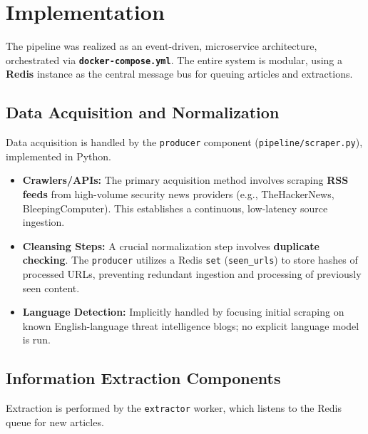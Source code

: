 \section{Implementation}

The pipeline was realized as an event-driven, microservice architecture, orchestrated via \textbf{\texttt{docker-compose.yml}}. The entire system is modular, using a \textbf{Redis} instance as the central message bus for queuing articles and extractions.

\subsection{Data Acquisition and Normalization}
Data acquisition is handled by the \texttt{producer} component (\texttt{pipeline/scraper.py}), implemented in Python.

\begin{itemize}
    \item \textbf{Crawlers/APIs:} The primary acquisition method involves scraping \textbf{RSS feeds} from high-volume security news providers (e.g., TheHackerNews, BleepingComputer). This establishes a continuous, low-latency source ingestion.
    \item \textbf{Cleansing Steps:} A crucial normalization step involves \textbf{duplicate checking}. The \texttt{producer} utilizes a Redis \texttt{set} (\texttt{seen\_urls}) to store hashes of processed URLs, preventing redundant ingestion and processing of previously seen content.
    \item \textbf{Language Detection:} Implicitly handled by focusing initial scraping on known English-language threat intelligence blogs; no explicit language model is run.
\end{itemize}

\subsection{Information Extraction Components}
Extraction is performed by the \texttt{extractor} worker, which listens to the Redis queue for new articles.

